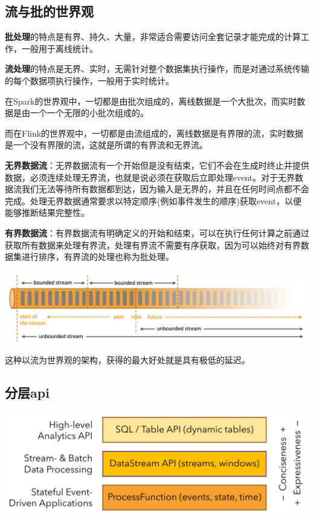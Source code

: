 \documentclass[oneside]{ctexbook}
\begin{document}
\subsection{流与批的世界观}

\textbf{批处理}的特点是有界、持久、大量，非常适合需要访问全套记录才能完成的计算工作，一般用于离线统计。

\textbf{流处理}的特点是无界、实时，无需针对整个数据集执行操作，而是对通过系统传输的每个数据项执行操作，一般用于实时统计。

在Spark的世界观中，一切都是由批次组成的，离线数据是一个大批次，而实时数据是由一个一个无限的小批次组成的。

而在Flink的世界观中，一切都是由流组成的，离线数据是有界限的流，实时数据是一个没有界限的流，这就是所谓的有界流和无界流。

\textbf{无界数据流}：无界数据流有一个开始但是没有结束，它们不会在生成时终止并提供数据，必须连续处理无界流，也就是说必须在获取后立即处理event。对于无界数据流我们无法等待所有数据都到达，因为输入是无界的，并且在任何时间点都不会完成。处理无界数据通常要求以特定顺序(例如事件发生的顺序)获取event，以便能够推断结果完整性。

\textbf{有界数据流}：有界数据流有明确定义的开始和结束，可以在执行任何计算之前通过获取所有数据来处理有界流，处理有界流不需要有序获取，因为可以始终对有界数据集进行排序，有界流的处理也称为批处理。

\noindent \includegraphics[width=\textwidth]{bounded-unbounded.png}

这种以流为世界观的架构，获得的最大好处就是具有极低的延迟。

\subsection{分层api}

\noindent \includegraphics[width=\textwidth]{api-stack.png}
\end{document}

